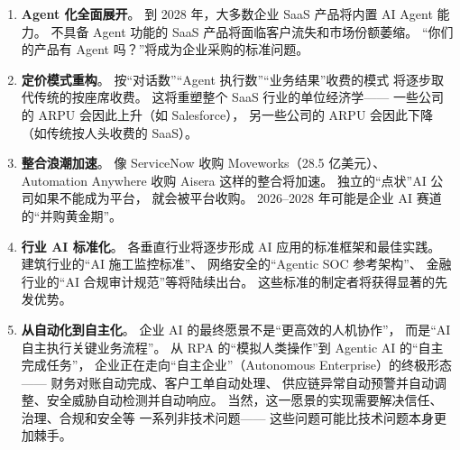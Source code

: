 \begin{enumerate}[noitemsep]
  \item \textbf{Agent 化全面展开}。
        到 2028 年，大多数企业 SaaS 产品将内置 AI Agent 能力。
        不具备 Agent 功能的 SaaS 产品将面临客户流失和市场份额萎缩。
        ``你们的产品有 Agent 吗？''将成为企业采购的标准问题。
  \item \textbf{定价模式重构}。
        按``对话数''``Agent 执行数''``业务结果''收费的模式
        将逐步取代传统的按座席收费。
        这将重塑整个 SaaS 行业的单位经济学——
        一些公司的 ARPU 会因此上升（如 Salesforce），
        另一些公司的 ARPU 会因此下降（如传统按人头收费的 SaaS）。
  \item \textbf{整合浪潮加速}。
        像 ServiceNow 收购 Moveworks（28.5 亿美元）、
        Automation Anywhere 收购 Aisera 这样的整合将加速。
        独立的``点状''AI 公司如果不能成为平台，
        就会被平台收购。
        2026--2028 年可能是企业 AI 赛道的``并购黄金期''。
  \item \textbf{行业 AI 标准化}。
        各垂直行业将逐步形成 AI 应用的标准框架和最佳实践。
        建筑行业的``AI 施工监控标准''、
        网络安全的``Agentic SOC 参考架构''、
        金融行业的``AI 合规审计规范''等将陆续出台。
        这些标准的制定者将获得显著的先发优势。
  \item \textbf{从自动化到自主化}。
        企业 AI 的最终愿景不是``更高效的人机协作''，
        而是``AI 自主执行关键业务流程''。
        从 RPA 的``模拟人类操作''到 Agentic AI 的``自主完成任务''，
        企业正在走向``自主企业''（Autonomous Enterprise）的终极形态——
        财务对账自动完成、客户工单自动处理、
        供应链异常自动预警并自动调整、安全威胁自动检测并自动响应。
        当然，这一愿景的实现需要解决信任、治理、合规和安全等
        一系列非技术问题——
        这些问题可能比技术问题本身更加棘手。
\end{enumerate}

